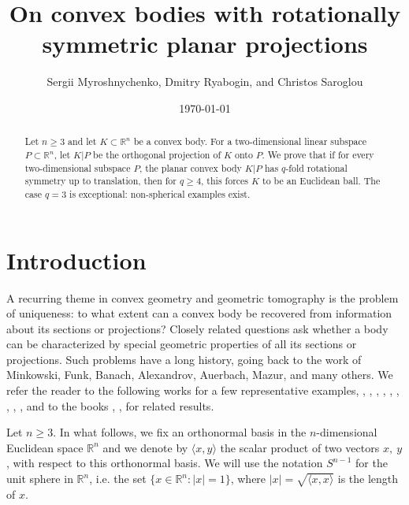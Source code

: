 \documentclass[11pt]{article}
\makeatletter
\theoremstyle{definition}
\newcommand{\subjclass}[2][1991]{%
	\let\@oldtitle\@title%
	\gdef\@title{\@oldtitle\footnotetext{#1 \emph{Mathematics subject classification.} #2}}%
}
\newcommand{\keywords}[1]{%
	\let\@@oldtitle\@title%
	\gdef\@title{\@@oldtitle\footnotetext{\emph{Key words and phrases.} #1.}}%
}
\makeatother
\begin{document}
	
	\title{On convex  bodies with  rotationally symmetric planar projections}
	
	
	\author{Sergii Myroshnychenko, Dmitry Ryabogin, and Christos Saroglou}
	
	\subjclass[2010]{52A30, 52A20, 52A39}
	\keywords{Sections and projections of convex bodies, characterizations of balls}
	
	
	\date{\today}
	\maketitle
	\begin{abstract}{Let $n\ge 3$ and let \(K\subset\mathbb R^n\) be a convex body. For a two-dimensional linear subspace
	\(P\subset\mathbb R^n\), let \(K|P\) be the orthogonal projection of \(K\) onto \(P\).
	We prove that if for every two-dimensional subspace \(P\), the planar
	convex body \(K|P\) has \(q\)-fold rotational symmetry up to translation, then 
	for  \(q\ge4\), this forces \(K\) to be an Euclidean ball. The case
	\(q=3\) is exceptional: non-spherical examples exist.}
\end{abstract}










\section{Introduction}


A recurring theme in convex geometry and geometric tomography is
the problem of uniqueness: to what extent can a convex body be recovered from information about its sections or projections? Closely related
questions ask whether a body can be characterized by special geometric properties of all its sections or projections. Such problems have
a long history, going back to the work of Minkowski, Funk, Banach,
Alexandrov, Auerbach, Mazur, and many others. We refer the reader to the following works for a few representative examples, \cite{AMU}, \cite{Gr}, \cite{M}, \cite{K1}, \cite{Bur}, \cite{Sch2}, \cite{BHJM}, \cite{IMN},   \cite{Za}, and to the books \cite{G}, \cite{Sc}, for related results.





Let $n\ge 3$. 
In what follows, we fix an orthonormal basis in the $n$-dimensional Euclidean space $\mathbb{R}^n$ and we denote by $\langle x,y\rangle$ the scalar product of two vectors $x,\ y$, with respect to this orthonormal basis. We will use the notation $S^{n-1}$ for the unit sphere in $\mathbb{R}^n$, i.e. the set $\{x\in\mathbb{R}^n:|x|=1\}$, where $|x|=\sqrt{\langle x,x\rangle}$ is the length of $x$. 
\end{document}
